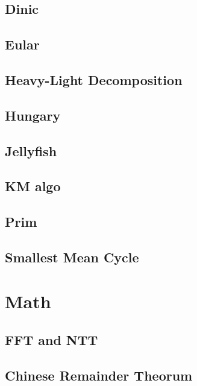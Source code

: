\documentclass[a4paper,10pt,twocolumn,oneside]{article}
\begin{document}
\subsection{Dinic}


\subsection{Eular}


\subsection{Heavy-Light Decomposition}


\subsection{Hungary}


\subsection{Jellyfish}


\subsection{KM algo}


\subsection{Prim}


\subsection{Smallest Mean Cycle}


\section{Math}

\subsection{FFT and NTT}


\subsection{Chinese Remainder Theorum}

\end{document}
